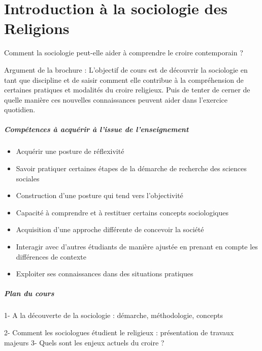 \chapter{Introduction à la sociologie des Religions}



Comment la sociologie peut-elle aider à comprendre le croire contemporain ?    

Argument de la brochure :  L’objectif de cours est de découvrir la sociologie en tant que discipline et de saisir comment elle contribue à la compréhension de certaines pratiques et modalités du croire religieux. Puis de tenter de cerner de quelle manière ces nouvelles connaissances peuvent aider dans l’exercice quotidien.   

\paragraph{Compétences à acquérir à l’issue de l’enseignement }
\begin{itemize}
\item Acquérir une posture de réflexivité 
\item Savoir pratiquer certaines étapes de la démarche de recherche des sciences sociales 
\item Construction d’une posture qui tend vers l’objectivité 
\item Capacité à comprendre et à restituer certains concepts sociologiques 
\item Acquisition d’une approche différente de concevoir la société  
\item Interagir avec d’autres étudiants de manière ajustée en prenant en compte les différences de contexte 
\item Exploiter ses connaissances dans des situations pratiques  
\end{itemize}


\paragraph{Plan du cours}
1- A la découverte de la sociologie : démarche, méthodologie, concepts 

2- Comment les sociologues étudient le religieux : présentation de travaux majeurs 3- Quels sont les enjeux actuels du croire ?  


